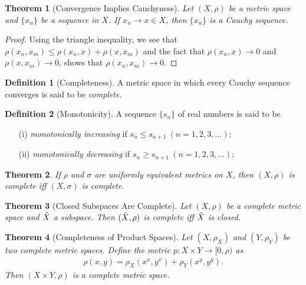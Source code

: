 \documentclass{article}
\newtheorem{theorem}{Theorem}[section]
\numberwithin{theorem}{subsection}
\numberwithin{theorem}{subsubsection}
\numberwithin{lemma}{subsection}
\numberwithin{lemma}{subsubsection}
\theoremstyle{definition}
\newtheorem{definition}{Definition}[section]
\numberwithin{definition}{subsection}
\numberwithin{definition}{subsubsection}
\begin{document}
\begin{theorem}[Convergence Implies Cauchyness]
    Let $(X,\rho)$ be a metric space and $\{x_{n}\}$ be a sequence in $X$. If $x_{n} \rightarrow x \in X$, then $\{x_{n}\}$ is a Cauchy sequence.
\end{theorem}

\begin{proof}
    Using the triangle inequality, we see that $\rho(x_{n},x_{m}) \leq \rho(x_{n},x) + \rho(x,x_{m})$ and the fact that $\rho(x_{n},x) \rightarrow 0$ and $\rho(x,x_{m}) \rightarrow 0$, shows that $\rho(x_{n},x_{m}) \rightarrow 0$.
\end{proof}

\begin{definition}[Completeness]
    A metric space in which every Cauchy sequence converges is said to be \textit{complete}.
\end{definition}

\begin{definition}[Monotonicity]
    A sequence $\{s_{n}\}$ of real numbers is said to be
    \begin{itemize}
        \item[(i)] \textit{monotonically increasing} if $s_{n} \leq s_{n+1}\ (n = 1,2,3,...)$;
        \item[(ii)] \textit{monotonically decreasing} if $s_{n} \geq s_{n+1}\ (n = 1,2,3,...)$;
    \end{itemize}
\end{definition}

\begin{theorem}
    If $\rho$ and $\sigma$ are uniformly equivalent metrics on $X$, then $(X,\rho)$ is complete iff $(X,\sigma)$ is complete.
\end{theorem}

\begin{theorem}[Closed Subspaces Are Complete]
    Let $(X,\rho)$ be a complete metric space and $\Tilde{X}$ a subspace. Then $(\Tilde{X},\rho)$ is complete iff $\Tilde{X}$ is closed.
\end{theorem}
\begin{theorem}[Completeness of Product Spaces]
    Let $(X,\rho_{X})$ and $(Y,\rho_{Y})$ be two complete metric spaces. Define the metric $p: X \times Y \rightarrow [0,\rho)$ as
    \begin{gather*}
        \rho(x,y) = \rho_{X}(x^x,y^x) + \rho_{Y}(x^y,y^y).
    \end{gather*}
    Then $(X\times Y,\rho)$ is a complete metric space.
\end{theorem}
\end{document}
